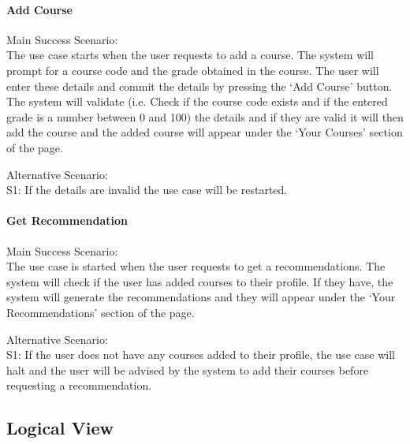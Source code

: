 \documentclass[10pt]{article}
\begin{document}
\paragraph{ Add Course \\}

Main Success Scenario: \\
The use case starts when the user requests to add a course. The system will prompt for a course code and the grade obtained in the course. The user will enter these details and  commit the details by pressing the ‘Add Course’ button. The system will validate (i.e. Check if the course code exists and if the entered grade is a number between 0 and 100) the details and if they are valid it will then add the course and the added course will appear under the ‘Your Courses’ section of the page.

Alternative Scenario: \\
S1: If the details are invalid the use case will be restarted.

\paragraph{ Get Recommendation \\}

Main Success Scenario:\\
The use case is started when the user requests to get a recommendations. The system will check if the user has added courses to their profile. If they have, the system will generate the recommendations and they will appear under the ‘Your Recommendations’ section of the page.

Alternative Scenario:\\
S1: If the user does not have any courses added to their profile, the use case will halt and the user will be advised by the system to add their courses before requesting a recommendation.

\subsection{Logical View}
\end{document}

